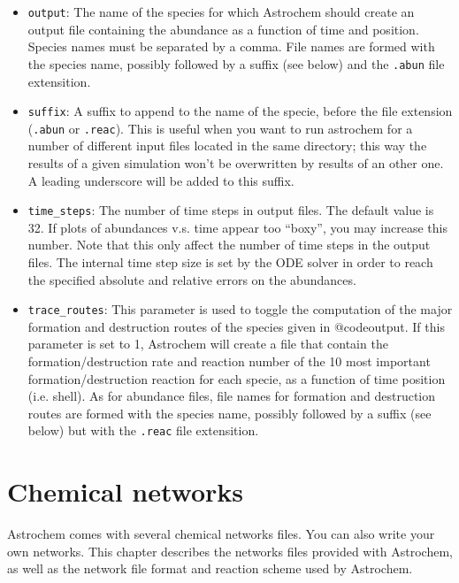 \documentclass[a4paper,12pt]{article}
\begin{document}
{\begin{itemize}
\item \verb=output=: The name of the species for which Astrochem
  should create an output file containing the abundance as a function
  of time and position. Species names must be separated by a
  comma. File names are formed with the species name, possibly
  followed by a suffix (see below) and the \verb=.abun= file
  extensition.

\item \verb=suffix=: A suffix to append to the name of the specie,
  before the file extension (\verb=.abun= or \verb=.reac=). This is
  useful when you want to run astrochem for a number of different
  input files located in the same directory; this way the results of a
  given simulation won't be overwritten by results of an other one. A
  leading underscore will be added to this suffix.

\item \verb=time_steps=: The number of time steps in output files. The
  default value is 32. If plots of abundances v.s. time appear too
  ``boxy'', you may increase this number. Note that this only affect
  the number of time steps in the output files. The internal time step
  size is set by the ODE solver in order to reach the specified
  absolute and relative errors on the abundances.

\item \verb=trace_routes=: This parameter is used to toggle the
  computation of the major formation and destruction routes of the
  species given in @code{output}. If this parameter is set to 1,
  Astrochem will create a file that contain the formation/destruction
  rate and reaction number of the 10 most important
  formation/destruction reaction for each specie, as a function of
  time position (i.e. shell). As for abundance files, file names for
  formation and destruction routes are formed with the species name,
  possibly followed by a suffix (see below) but with the \verb=.reac=
  file extensition.

\end{itemize}

\section{Chemical networks}
\label{sec:chemical-networks}

Astrochem comes with several chemical networks files. You can also write
your own networks. This chapter describes the networks files provided
with Astrochem, as well as the network file format and reaction scheme
used by Astrochem.

}
\end{document}
